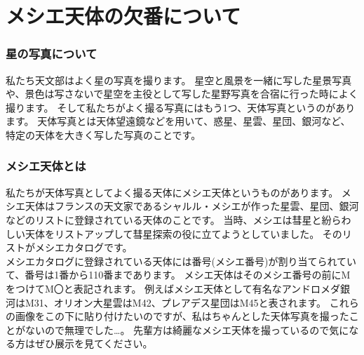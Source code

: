 \documentclass[../main]{subfiles}
\begin{document}
\chapter{メシエ天体の欠番について} %

\subsection*{星の写真について}
私たち天文部はよく星の写真を撮ります。
星空と風景を一緒に写した星景写真や、景色は写さないで星空を主役として写した星野写真を合宿に行った時によく撮ります。
そして私たちがよく撮る写真にはもう1つ、天体写真というのがあります。
天体写真とは天体望遠鏡などを用いて、惑星、星雲、星団、銀河など、特定の天体を大きく写した写真のことです。

\subsection*{メシエ天体とは}
私たちが天体写真としてよく撮る天体にメシエ天体というものがあります。
メシエ天体はフランスの天文家であるシャルル・メシエが作った星雲、星団、銀河などのリストに登録されている天体のことです。
当時、メシエは彗星と紛らわしい天体をリストアップして彗星探索の役に立てようとしていました。
そのリストがメシエカタログです。\\
メシエカタログに登録されている天体には番号(メシエ番号)が割り当てられていて、番号は1番から110番まであります。
メシエ天体はそのメシエ番号の前にMをつけてM〇と表記されます。
例えばメシエ天体として有名なアンドロメダ銀河はM31、オリオン大星雲はM42、プレアデス星団はM45と表されます。
これらの画像をこの下に貼り付けたいのですが、私はちゃんとした天体写真を撮ったことがないので無理でした…。
先輩方は綺麗なメシエ天体を撮っているので気になる方はぜひ展示を見てください。
\end{document}
